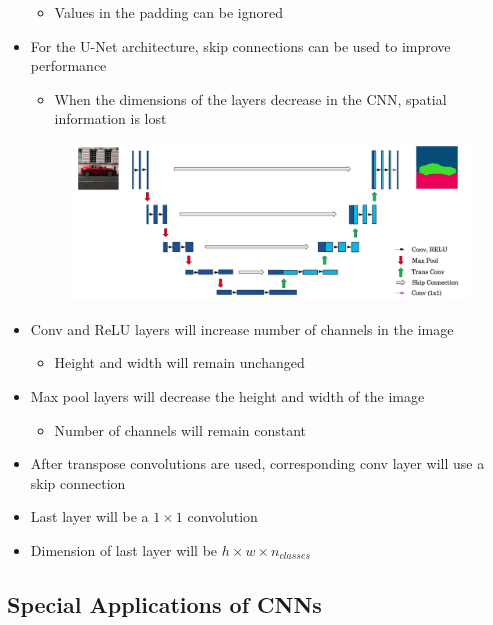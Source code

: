 \documentclass[12pt, letterpaper]{article}
\begin{document}
\begin{itemize}
\begin{itemize}
            \item Values in the padding can be ignored
        \end{itemize}
        \item For the U-Net architecture, skip connections can be used to improve performance
        \begin{itemize}
            \item When the dimensions of the layers decrease in the CNN, spatial information is lost
        \end{itemize}
        \begin{figure}[ht]
            \centering 
            \includegraphics[width=16cm]{31.png}
        \end{figure}
        \item Conv and ReLU layers will increase number of channels in the image 
        \begin{itemize}
            \item Height and width will remain unchanged  
        \end{itemize}
        \item Max pool layers will decrease the height and width of the image
        \begin{itemize}
            \item Number of channels will remain constant
        \end{itemize}
        \item After transpose convolutions are used, corresponding conv layer will use a skip connection
        \item Last layer will be a $1\times 1$ convolution
        \item Dimension of last layer will be $h\times w\times n_{classes}$
    \end{itemize}

    \subsection{Special Applications of CNNs}
\end{document}
